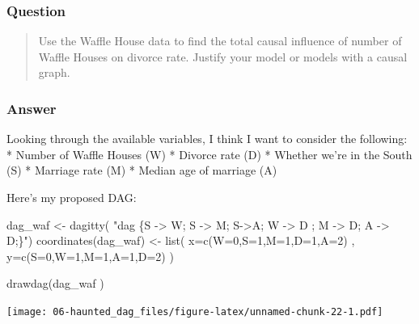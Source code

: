 \documentclass[
]{book}
\newenvironment{Shaded}{\begin{snugshade}}{\end{snugshade}}
\newcommand{\AttributeTok}[1]{\textcolor[rgb]{0.77,0.63,0.00}{#1}}
\newcommand{\DecValTok}[1]{\textcolor[rgb]{0.00,0.00,0.81}{#1}}
\newcommand{\FunctionTok}[1]{\textcolor[rgb]{0.00,0.00,0.00}{#1}}
\newcommand{\NormalTok}[1]{#1}
\newcommand{\OtherTok}[1]{\textcolor[rgb]{0.56,0.35,0.01}{#1}}
\newcommand{\StringTok}[1]{\textcolor[rgb]{0.31,0.60,0.02}{#1}}
\begin{document}
\hypertarget{question-55}{%
\subsubsection*{Question}\label{question-55}}

\begin{quote}
Use the Waffle House data to find the total causal influence of number of Waffle Houses on divorce rate. Justify your model or models with a causal graph.
\end{quote}

\hypertarget{answer-55}{%
\subsubsection*{Answer}\label{answer-55}}

Looking through the available variables, I think I want to consider the following:
* Number of Waffle Houses (W)
* Divorce rate (D)
* Whether we're in the South (S)
* Marriage rate (M)
* Median age of marriage (A)

Here's my proposed DAG:

\begin{Shaded}
\begin{Highlighting}[]
\NormalTok{dag\_waf }\OtherTok{\textless{}{-}} \FunctionTok{dagitty}\NormalTok{( }\StringTok{"dag \{S {-}\textgreater{} W; S {-}\textgreater{} M; S{-}\textgreater{}A; W {-}\textgreater{} D ; M {-}\textgreater{} D; A {-}\textgreater{} D;\}"}\NormalTok{)}
\FunctionTok{coordinates}\NormalTok{(dag\_waf) }\OtherTok{\textless{}{-}} \FunctionTok{list}\NormalTok{( }\AttributeTok{x=}\FunctionTok{c}\NormalTok{(}\AttributeTok{W=}\DecValTok{0}\NormalTok{,}\AttributeTok{S=}\DecValTok{1}\NormalTok{,}\AttributeTok{M=}\DecValTok{1}\NormalTok{,}\AttributeTok{D=}\DecValTok{1}\NormalTok{,}\AttributeTok{A=}\DecValTok{2}\NormalTok{) , }\AttributeTok{y=}\FunctionTok{c}\NormalTok{(}\AttributeTok{S=}\DecValTok{0}\NormalTok{,}\AttributeTok{W=}\DecValTok{1}\NormalTok{,}\AttributeTok{M=}\DecValTok{1}\NormalTok{,}\AttributeTok{A=}\DecValTok{1}\NormalTok{,}\AttributeTok{D=}\DecValTok{2}\NormalTok{) )}

\FunctionTok{drawdag}\NormalTok{(dag\_waf )}
\end{Highlighting}
\end{Shaded}

\texttt{[image: 06-haunted\_dag\_files/figure-latex/unnamed-chunk-22-1.pdf]}
\end{document}

